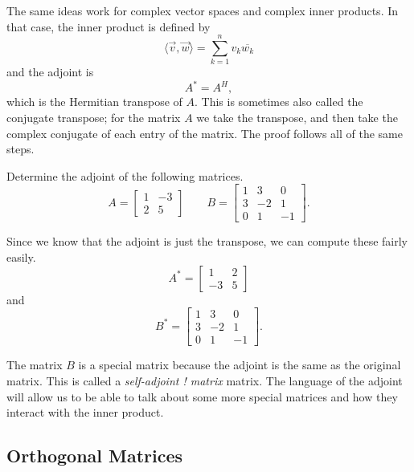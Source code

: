 \documentclass{ximera}
\begin{document}
\begin{remark}
    The same ideas work for complex vector spaces and complex inner products. In that case, the inner product is defined by 
    \[ 
        \langle \vec{v}, \vec{w} \rangle = \sum_{k=1}^n v_k\overline{w_k} 
    \] 
    and the adjoint is 
    \[
        A^* = A^H,
    \] 
    which is the Hermitian transpose of $A$. This is sometimes also called the conjugate transpose; for the matrix $A$ we take the transpose, and then take the complex conjugate of each entry of the matrix. The proof follows all of the same steps.
\end{remark}

\begin{example}
    Determine the adjoint of the following matrices.
    \[ 
        A = 
        \begin{bmatrix}
            1 & -3 \\ 
            2 & 5 
        \end{bmatrix} 
        \qquad B = 
        \begin{bmatrix} 
            1 & 3 & 0 \\ 
            3 & -2 & 1 \\ 
            0 & 1 & -1 
        \end{bmatrix}. 
    \]
\end{example}

\begin{exampleSol}
    Since we know that the adjoint is just the transpose, we can compute these fairly easily.
    \[ 
        A^* = 
        \begin{bmatrix} 
            1 & 2 \\ 
            -3 & 5 
        \end{bmatrix} 
    \] 
    and
    \[ 
        B^* = 
        \begin{bmatrix} 
            1 & 3 & 0 \\ 
            3 & -2 & 1 \\ 
            0 & 1 & -1 
        \end{bmatrix}. 
    \]
\end{exampleSol}

The matrix $B$ is a special matrix because the adjoint is the same as the original matrix. This is called a \emph{self-adjoint ! matrix} matrix. The language of the adjoint will allow us to be able to talk about some more special matrices and how they interact with the inner product.


\subsection{Orthogonal Matrices}
\end{document}
